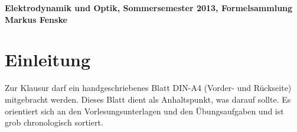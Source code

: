 \documentclass[a4paper,german,12pt,smallheadings]{scrartcl}
\begin{document}
\begin{center}
\bfseries %
\sffamily %
\vspace{-40pt}
Elektrodynamik und Optik, Sommersemester 2013, Formelsammlung \\
Markus Fenske
\vspace{-10pt}
\end{center}

\section{Einleitung}

Zur Klausur darf ein handgeschriebenes Blatt DIN-A4 (Vorder- und Rückseite)
mitgebracht werden. Dieses Blatt dient als Anhaltspunkt, was darauf sollte. Es
orientiert sich an den Vorlesungsunterlagen und den Übungsaufgaben und ist grob
chronologisch sortiert.
\end{document}
